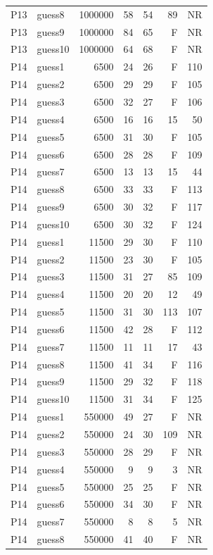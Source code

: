 {\begin{longtable}{llrrrrr}
P13 & guess8 & 1000000 & 58 & 54 & 89 & NR \\
P13 & guess9 & 1000000 & 84 & 65 & F & NR \\
P13 & guess10 & 1000000 & 64 & 68 & F & NR \\
P14 & guess1 & 6500 & 24 & 26 & F & 110 \\
P14 & guess2 & 6500 & 29 & 29 & F & 105 \\
P14 & guess3 & 6500 & 32 & 27 & F & 106 \\
P14 & guess4 & 6500 & 16 & 16 & 15 & 50 \\
P14 & guess5 & 6500 & 31 & 30 & F & 105 \\
P14 & guess6 & 6500 & 28 & 28 & F & 109 \\
P14 & guess7 & 6500 & 13 & 13 & 15 & 44 \\
P14 & guess8 & 6500 & 33 & 33 & F & 113 \\
P14 & guess9 & 6500 & 30 & 32 & F & 117 \\
P14 & guess10 & 6500 & 30 & 32 & F & 124 \\
P14 & guess1 & 11500 & 29 & 30 & F & 110 \\
P14 & guess2 & 11500 & 23 & 30 & F & 105 \\
P14 & guess3 & 11500 & 31 & 27 & 85 & 109 \\
P14 & guess4 & 11500 & 20 & 20 & 12 & 49 \\
P14 & guess5 & 11500 & 31 & 30 & 113 & 107 \\
P14 & guess6 & 11500 & 42 & 28 & F & 112 \\
P14 & guess7 & 11500 & 11 & 11 & 17 & 43 \\
P14 & guess8 & 11500 & 41 & 34 & F & 116 \\
P14 & guess9 & 11500 & 29 & 32 & F & 118 \\
P14 & guess10 & 11500 & 31 & 34 & F & 125 \\
P14 & guess1 & 550000 & 49 & 27 & F & NR \\
P14 & guess2 & 550000 & 24 & 30 & 109 & NR \\
P14 & guess3 & 550000 & 28 & 29 & F & NR \\
P14 & guess4 & 550000 & 9 & 9 & 3 & NR \\
P14 & guess5 & 550000 & 25 & 25 & F & NR \\
P14 & guess6 & 550000 & 34 & 30 & F & NR \\
P14 & guess7 & 550000 & 8 & 8 & 5 & NR \\
P14 & guess8 & 550000 & 41 & 40 & F & NR \\

\end{longtable}}
